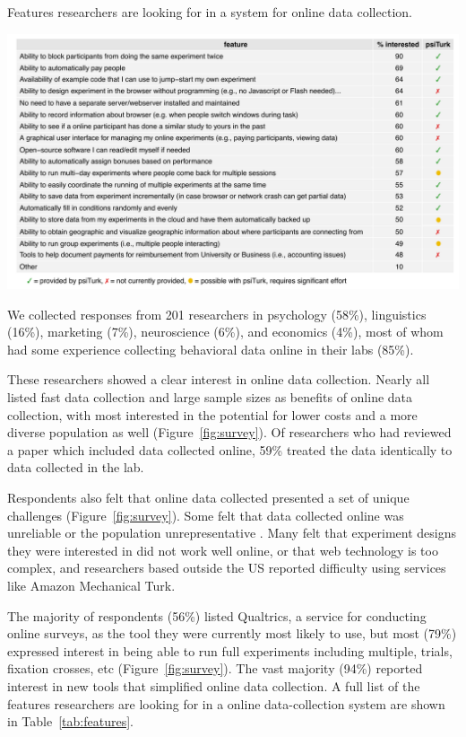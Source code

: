 \documentclass[twocolumn]{svjour3}          %
\begin{document}
\begin{table}[tp]
\centering
\caption{Features researchers are looking for in a system for online data collection.}
\includegraphics[width=\textwidth]{figures/featuresTable.pdf}
\label{tab:features}
\end{table}

 We collected responses from 201 researchers in psychology (58\%),
linguistics (16\%), marketing (7\%), neuroscience (6\%), and economics (4\%), most of whom had some
experience collecting behavioral data online in their labs (85\%).

These researchers showed a clear interest in online data collection. Nearly all listed fast data
collection and large sample sizes as benefits of online data collection, with most
interested in the potential for lower costs and a more diverse population as well (Figure~\ref{fig:survey}). Of researchers who had reviewed a paper which included data collected online, 59\% treated the data identically to data collected in the lab.


Respondents also felt that online data collected presented a set of unique challenges (Figure~\ref{fig:survey}). 
Some felt that data collected online was unreliable or the
population unrepresentative . Many felt that experiment designs they were interested in did
not work well online, or that web technology is too complex, and researchers based
outside the US reported difficulty using services like Amazon Mechanical Turk.


The majority of respondents (56\%) listed Qualtrics, a service for conducting online surveys, as the tool they
were currently most likely to use, but most (79\%) expressed interest in being able to run full
experiments including multiple, trials, fixation crosses, etc (Figure~\ref{fig:survey}). The vast majority (94\%) reported
interest in new tools that simplified online data collection. A full list of the features researchers are looking for in a online data-collection system are shown in Table~\ref{tab:features}.
\end{document}
